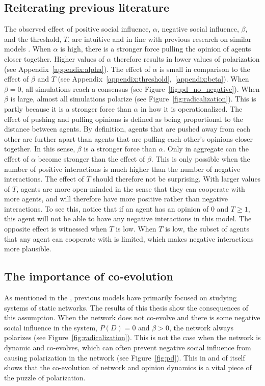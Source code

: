 \documentclass[11pt]{article}
\begin{document}
\subsection{Reiterating previous literature}
The observed effect of positive social influence, $\alpha$, negative social influence, $\beta$, and the threshold, $T$, are intuitive and in line with previous research on similar models \cite{flache_models_2017}.  When $\alpha$ is high, there is a stronger force pulling the opinion of agents closer together. Higher values of $\alpha$ therefore results in lower values of polarization (see Appendix~\ref{appendix:alpha}). 
The effect of $\alpha$ is small in comparison to the effect of $\beta$ and $T$ (see Appendix~\ref{appendix:threshold},~\ref{appendix:beta}).
When $\beta = 0$, all simulations reach a consensus (see Figure~\ref{fig:pd_no_negative}). When $\beta$ is large, almost all simulations polarize (see Figure~\ref{fig:radicalization}). This is partly because it is a stronger force than $\alpha$ in how it is operationalized.  The effect of pushing and pulling opinions is defined as being proportional to the distance between agents. 
By definition, agents that are pushed away from each other are further apart than agents that are pulling each other's opinions closer together. In this sense, $\beta$ is a stronger force than $\alpha$. Only in aggregate can the effect of $\alpha$ become stronger than the effect of $\beta$. This is only possible when the number of positive interactions is much higher than the number of negative interactions. The effect of $T$ should therefore not be surprising. With larger values of $T$, agents are more open-minded in the sense that they can cooperate with more agents, and will therefore have more positive rather than negative interactions. To see this, notice that if an agent has an opinion of 0 and $T\geq1$, this agent will not be able to have any negative interactions in this model. The opposite effect is witnessed when $T$ is low. When $T$ is low, the subset of agents that any agent can cooperate with is limited, which makes negative interactions more plausible.
\subsection{The importance of co-evolution}
As mentioned in the \textit{}, previous models have primarily focused on studying systems of static networks.
The results of this thesis show the consequences of this assumption. When the network does not co-evolve and there is some negative social influence in the system, $P(D) = 0$ and $\beta > 0$, the network always polarizes (see Figure~\ref{fig:radicalization}).
This is not the case when the network is dynamic and co-evolves, which can often prevent negative social influence from causing polarization in the network (see Figure~\ref{fig:pd}).
This in and of itself shows that the co-evolution of network and opinion dynamics is a vital piece of the puzzle of polarization. 
\end{document}
